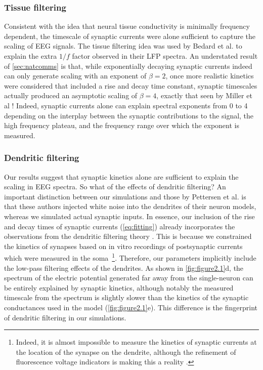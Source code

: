 \subsubsection{Tissue filtering}
Consistent with the idea that neural tissue conductivity is minimally frequency dependent, the timescale of synaptic currents were alone sufficient to capture the scaling of EEG signals. The tissue filtering idea was used by Bedard et al. \cite{Bedard2006a} to explain the extra $1/f$ factor observed in their LFP spectra. An understated result of \autoref{sec:natcomms} is that, while exponentially decaying synaptic currents indeed can only generate scaling with an exponent of $\beta=2$, once more realistic kinetics were considered that included a rise and decay time constant, synaptic timescales actually produced an asymptotic scaling of $\beta=4$, exactly that seen by Miller et al \cite{Miller2009}! Indeed, synaptic currents alone can explain spectral exponents from 0 to 4 depending on the interplay between the synaptic contributions to the signal, the high frequency plateau, and the frequency range over which the exponent is measured.

\subsubsection{Dendritic filtering}
Our results suggest that synaptic kinetics alone are sufficient to explain the scaling in EEG spectra. So what of the effects of dendritic filtering? An important distinction between our simulations and those by Pettersen et al. \cite{Pettersen2014} is that these authors injected white noise into the dendrites of their neuron models, whereas we simulated actual synaptic inputs. In essence, our inclusion of the rise and decay times of synaptic currents (\ref{eq:fitting}) already incorporates the observations from the dendritic filtering theory \cite{Linden2010, Pettersen2008, Pettersen2014}. This is because we constrained the kinetics of synapses based on in vitro recordings of postsynaptic currents which were measured in the soma~\footnote[2]{Indeed, it is almost impossible to measure the kinetics of synaptic currents at the location of the synapse on the dendrite, although the refinement of fluorescence voltage indicators is making this a reality \cite{Knopfel2019}.}. Therefore, our parameters implicitly include the low-pass filtering effects of the dendrites. As shown in \autoref{fig:figure2.1}d, the spectrum of the electric potential generated far away from the single-neuron can be entirely explained by synaptic kinetics, although notably the measured timescale from the spectrum is slightly slower than the kinetics of the synaptic conductances used in the model (\autoref{fig:figure2.1}e). This difference is the fingerprint of dendritic filtering in our simulations. 

